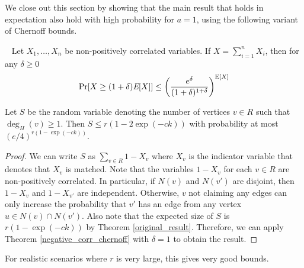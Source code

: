 


We close out this section by showing that the main result that holds in expectation also hold with high probability for $a=1$, using the following variant of Chernoff bounds.

\begin{thm}\label{negative_corr_chernoff}~\cite{AugerDoerr2011}
Let $X_1,\ldots, X_n$ be non-positively correlated variables. If $X=\sum_{i=1}^n X_i$, then for any $\delta\geq 0$
\[ \Pr[X \geq (1+\delta)\emph{\text{E}}[X] ] \leq \left(\frac{e^\delta}{(1+\delta)^{1+\delta}}\right)^{\text{E}[X]} \]
\end{thm}


\begin{thm}
Let $S$ be the random variable denoting the number of vertices $v \in R$ such that $\deg_{H}(v)\geq 1$. Then
$ S \leq r(1-2\exp(-ck))$ with probability at most $(e/4)^{r(1-\exp(-ck))}$.
\end{thm}

\begin{proof}
We can write $S$ as $\sum_{v\in R} 1-X_v$ where $X_v$ is the indicator
variable that denotes that $X_v$ is matched. Note that the variables
$1-X_v$ for each $v\in R$ are non-positively correlated. In
particular, if $N(v)$ and $N(v')$ are disjoint, then $1-X_v$ and
$1-X_{v'}$ are independent. Otherwise, $v$ not claiming any edges can
only increase the probability that $v'$ has an edge from any vertex
$u\in N(v)\cap N(v')$. Also note that the expected size of $S$ is
$r(1-\exp(-ck))$ by Theorem \ref{original_result}. Therefore, we can
apply Theorem \ref{negative_corr_chernoff} with $\delta=1$ to obtain
the result.
\end{proof}
For realistic scenarios where $r$ is very large, this gives very good bounds. 
